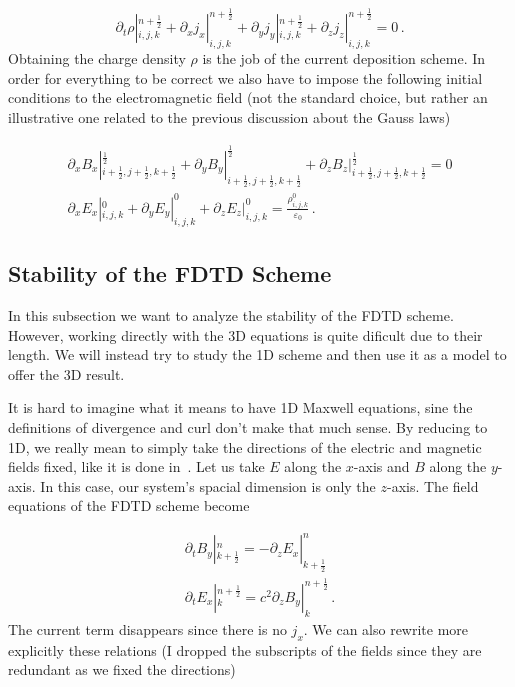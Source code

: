 \documentclass[12pt, class=report, crop=false]{standalone}
\begin{document}
\begin{equation}
  \partial_t \rho|^{n+\frac{1}{2}}_{i,j,k} +
  \partial_x j_x|^{n+\frac{1}{2}}_{i,j,k} +
  \partial_y j_y|^{n+\frac{1}{2}}_{i,j,k} +
  \partial_z j_z|^{n+\frac{1}{2}}_{i,j,k} = 0\,.
\end{equation}
Obtaining the charge density \(\rho\) is the job of the current deposition scheme. In order for everything to be correct we also have to impose the following initial conditions to the electromagnetic field (not the standard choice, but rather an illustrative one related to the previous discussion about the Gauss laws)

\begin{subequations}
  \begin{align}
    \partial_x B_x|^{\frac{1}{2}}_{i+\frac{1}{2},j+\frac{1}{2},k+\frac{1}{2}} +
    \partial_y B_y|^{\frac{1}{2}}_{i+\frac{1}{2},j+\frac{1}{2},k+\frac{1}{2}} +
    \partial_z B_z|^{\frac{1}{2}}_{i+\frac{1}{2},j+\frac{1}{2},k+\frac{1}{2}} = 0
    \\
    \partial_x E_x|^{0}_{i,j,k} +
    \partial_y E_y|^{0}_{i,j,k} +
    \partial_z E_z|^{0}_{i,j,k} =
    \frac{\rho^{0}_{i,j,k}}{\varepsilon_0}
    \,.
  \end{align}
\end{subequations}

\subsection{Stability of the FDTD Scheme}
In this subsection we want to analyze the stability of the FDTD scheme. However, working directly with the 3D equations is quite dificult due to their length. We will instead try to study the 1D scheme and then use it as a model to offer the 3D result.

It is hard to imagine what it means to have 1D Maxwell equations, sine the definitions of divergence and curl don't make that much sense. By reducing to 1D, we really mean to simply take the directions of the electric and magnetic fields fixed, like it is done in~\cite{leheElectromagneticWavePropagation2016}. Let us take \(E\) along the \(x\)-axis and \(B\) along the \(y\)-axis. In this case, our system's spacial dimension is only the \(z\)-axis. The field equations of the FDTD scheme become

\begin{subequations}
  \begin{align}
  \partial_t B_y|^n_{k+\frac{1}{2}} =
  - \partial_z E_x|^n_{k+\frac{1}{2}} \\
  \partial_t E_x|^{n+\frac{1}{2}}_{k} =
  c^2 \partial_z B_y|^{n+\frac{1}{2}}_{k}\,.
  \end{align}
\end{subequations}
The current term disappears since there is no \(j_x\). We can also rewrite more explicitly these relations (I dropped the subscripts of the fields since they are redundant as we fixed the directions)
\end{document}
